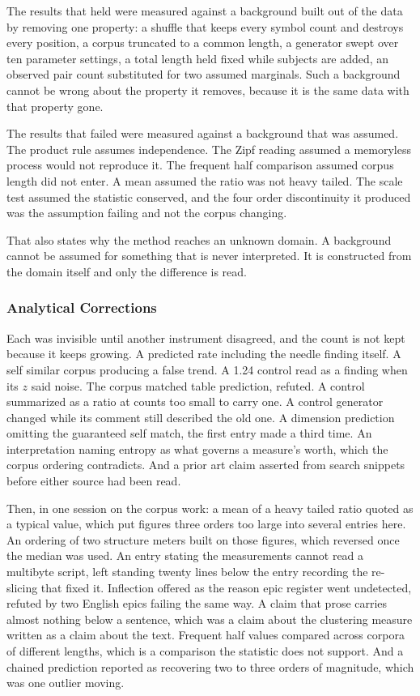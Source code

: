 The results that held were measured against a background built out of the data by removing one property: a shuffle that keeps every symbol count and destroys every position, a corpus truncated to a common length, a generator swept over ten parameter settings, a total length held fixed while subjects are added, an observed pair count substituted for two assumed marginals. Such a background cannot be wrong about the property it removes, because it is the same data with that property gone.

The results that failed were measured against a background that was assumed. The product rule assumes independence. The Zipf reading assumed a memoryless process would not reproduce it. The frequent half comparison assumed corpus length did not enter. A mean assumed the ratio was not heavy tailed. The scale test assumed the statistic conserved, and the four order discontinuity it produced was the assumption failing and not the corpus changing.

That also states why the method reaches an unknown domain. A background cannot be assumed for something that is never interpreted. It is constructed from the domain itself and only the difference is read.

\subsubsection{Analytical Corrections}

Each was invisible until another instrument disagreed, and the count is not kept because it keeps growing. A predicted rate including the needle finding itself. A self similar corpus producing a false trend. A 1.24 control read as a finding when its \(z\) said noise. The corpus matched table prediction, refuted. A control summarized as a ratio at counts too small to carry one. A control generator changed while its comment still described the old one. A dimension prediction omitting the guaranteed self match, the first entry made a third time. An interpretation naming entropy as what governs a measure's worth, which the corpus ordering contradicts. And a prior art claim asserted from search snippets before either source had been read.

Then, in one session on the corpus work: a mean of a heavy tailed ratio quoted as a typical value, which put figures three orders too large into several entries here. An ordering of two structure meters built on those figures, which reversed once the median was used. An entry stating the measurements cannot read a multibyte script, left standing twenty lines below the entry recording the re-slicing that fixed it. Inflection offered as the reason epic register went undetected, refuted by two English epics failing the same way. A claim that prose carries almost nothing below a sentence, which was a claim about the clustering measure written as a claim about the text. Frequent half values compared across corpora of different lengths, which is a comparison the statistic does not support. And a chained prediction reported as recovering two to three orders of magnitude, which was one outlier moving.

